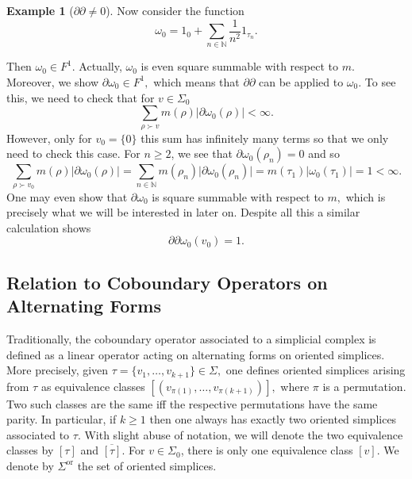 \documentclass[10pt]{amsart}
\theoremstyle{definition}
\newtheorem{example}[theorem]{Example}
\newcommand{\F}{{F}}
\begin{document}
\begin{example}[$\partial\partial\neq 0$]
     
     
     
     
     
     
     Now consider the function
     $$\omega_0 = 1_{0} + \sum_{n\in\mathbb{N}}\frac{1}{n^2}1_{\tau_n}.$$
     
       Then $\omega_0\in \F^1.$ Actually, $\omega_0$ is even square summable with respect to $m$. Moreover, we show $\partial\omega_0\in \F^1,$ which means that $\partial\partial$ can be applied to $\omega_0$. To see this, we need to check that for $v\in\Sigma_0$
    $$\sum_{\rho\succ v} m(\rho)\vert\partial\omega_0(\rho)\vert<\infty.$$
    However, only for $v_{0}= \lbrace 0\rbrace$ this sum has infinitely many terms so that we only need to check this case. For $n\geq 2$, we see that $\partial\omega_0(\rho_n) = 0$ and so
        $$\sum_{\rho\succ v_{0}}m(\rho)\vert\partial\omega_0(\rho)\vert = \sum_{n\in\mathbb{N}}m(\rho_n)\vert\partial\omega_0(\rho_n)\vert
     = m(\tau_1)\vert\omega_0(\tau_1)\vert = 1<\infty.$$
    One may even show that $\partial\omega_0$ is square summable with respect to $m,$ which is precisely what we will be interested in later on. Despite all this a similar calculation shows $$\partial\partial\omega_0(v_0) = 1.$$
\end{example}





\subsection{Relation to Coboundary Operators on Alternating Forms}\label{altern}

Traditionally, the coboundary operator associated to a simplicial complex is defined as a linear operator acting on alternating forms on oriented simplices. More precisely, given $\tau = \lbrace v_1,\ldots,v_{k+1}\rbrace\in\Sigma,$ one defines oriented simplices arising from $\tau$ as equivalence classes $[(v_{\pi(1)},\ldots,v_{\pi(k+1)})],$ where $\pi$ is a permutation. Two such classes are the same iff the respective permutations have the same parity. In particular, if $k\geq1$ then one always has exactly two oriented simplices associated to $\tau.$ 
With slight abuse of notation, we will denote the two equivalence classes by $[\tau]$ and $\overline{[\tau]}.$ For $v\in \Sigma_{0}$, there is only one equivalence class $[v]$. We denote by $\Sigma^{\mathrm{or}}$ the set of oriented simplices.
\end{document}
